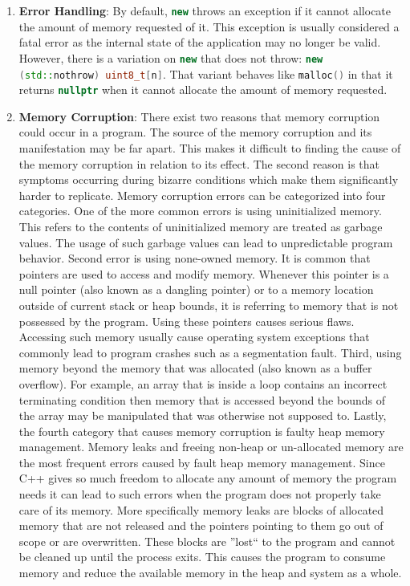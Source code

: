 \documentclass[letterpaper, 12pt]{article}
\newcommand{\inlinecode}[1]{\colorbox{codegrey}{\lstinline[language=C++]{#1}}}
\begin{document}
\begin{enumerate}
  \item {\bfseries Error Handling}:
  By default, \inlinecode{new} throws an exception if it cannot allocate the amount of memory
  requested of it. This exception is usually considered a fatal error as the internal state of
  the application may no longer be valid. However, there is a variation on \inlinecode{new} that
  does not throw: \inlinecode{new (std::nothrow) uint8_t[n]}. That variant behaves like \inlinecode{malloc()}
  in that it returns \inlinecode{nullptr} when it cannot allocate the amount of memory requested.

  \item {\bfseries Memory Corruption}:
  There exist two reasons that memory corruption could occur in a program. The source of the 
  memory corruption and its manifestation may be far apart. This makes it difficult to finding 
  the cause of the memory corruption in relation to its effect. The second reason is that symptoms 
  occurring during bizarre conditions which make them significantly harder to replicate. Memory 
  corruption errors can be categorized into four categories. One of the more common errors is using 
  uninitialized memory. This refers to the contents of uninitialized memory are treated as garbage 
  values. The usage of such garbage values can lead to unpredictable program behavior. Second error 
  is using none-owned memory. It is common that pointers are used to access and modify memory. 
  Whenever this pointer is a null pointer (also known as a dangling pointer) or to a memory location 
  outside of current stack or heap bounds, it is referring to memory that is not possessed by the program. 
  Using these pointers causes serious flaws. Accessing such memory usually cause operating system exceptions that commonly 
  lead to program crashes such as a segmentation fault. Third, using memory beyond the memory that was 
  allocated (also known as a buffer overflow). For example, an array that is inside a loop contains an 
  incorrect terminating condition then memory that is accessed beyond the bounds of the array may be 
  manipulated that was otherwise not supposed to. Lastly, the fourth category that causes memory corruption 
  is faulty heap memory management. Memory leaks and freeing non-heap or un-allocated memory are the 
  most frequent errors caused by fault heap memory management. Since C++ gives so much freedom to 
  allocate any amount of memory the program needs it can lead to such errors when the program does 
  not properly take care of its memory. More specifically memory leaks are blocks of allocated memory 
  that are not released and the pointers pointing to them go out of scope or are overwritten. These blocks
  are ''lost`` to the program and cannot be cleaned up until the process exits. This causes the program to 
  consume memory and reduce the available memory in the heap and system as a whole.
\end{enumerate}
\end{document}
